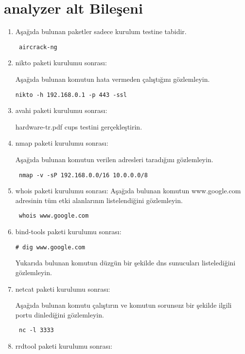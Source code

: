 \documentclass[a4paper,10pt]{article}
\begin{document}
\section{analyzer alt Bileşeni}
\begin{enumerate}
\item Aşağıda bulunan paketler sadece kurulum testine tabidir.
\begin{verbatim}
 aircrack-ng
\end{verbatim}
\item nikto paketi kurulumu sonrası:

Aşağıda bulunan komutun hata vermeden çalıştığını gözlemleyin.
\begin{verbatim}
nikto -h 192.168.0.1 -p 443 -ssl 
\end{verbatim}


\item avahi paketi kurulumu sonrası:

hardware-tr.pdf cups testini gerçekleştirin.

\item nmap paketi kurulumu sonrası:

Aşağıda bulunan komutun verilen adresleri taradığını gözlemleyin.
\begin{verbatim}
 nmap -v -sP 192.168.0.0/16 10.0.0.0/8
\end{verbatim}

 
\item whois paketi kurulumu sonrası:
Aşağıda bulunan komutun www.google.com adresinin tüm etki alanlarının listelendiğini gözlemleyin.
\begin{verbatim}
 whois www.google.com
\end{verbatim}


\item bind-tools paketi kurulumu sonrası:

\begin{verbatim}
# dig www.google.com
\end{verbatim}
Yukarıda bulunan komutun düzgün bir şekilde dns sunucuları listelediğini gözlemleyin.

\item netcat paketi kurulumu sonrası:

Aşağıda bulunan komutu çalıştırın ve komutun sorunsuz bir şekilde ilgili portu dinlediğini gözlemleyin.
\begin{verbatim}
 nc -l 3333 
\end{verbatim}

\item rrdtool paketi kurulumu sonrası:


\end{enumerate}
\end{document}
